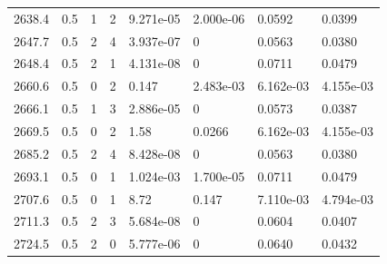 \documentclass[preview]{standalone}
\begin{document}
{{{{{{{\begin{tabular}{L{1.2cm}C{1.2cm} C{0.3cm}C{0.5cm} C{1.4cm}C{1.4cm} C{1.4cm}C{1.4cm}}
  2638.4  &   0.5  & 1     &  2 &  9.271e-05  & 2.000e-06  & 0.0592 &  0.0399   \\ 
  2647.7  &   0.5  & 2     &  4 &  3.937e-07  & 0  & 0.0563 &  0.0380   \\ 
  2648.4  &   0.5  & 2     &  1 &  4.131e-08  & 0  & 0.0711 &  0.0479   \\ 
  2660.6  &   0.5  & 0     &  2 &  0.147  & 2.483e-03  & 6.162e-03 &  4.155e-03   \\ 
  2666.1  &   0.5  & 1     &  3 &  2.886e-05  & 0  & 0.0573 &  0.0387   \\ 
  2669.5  &   0.5  & 0     &  2 &  1.58  & 0.0266  & 6.162e-03 &  4.155e-03   \\ 
  2685.2  &   0.5  & 2     &  4 &  8.428e-08  & 0  & 0.0563 &  0.0380   \\ 
  2693.1  &   0.5  & 0     &  1 &  1.024e-03  & 1.700e-05  & 0.0711 &  0.0479   \\ 
  2707.6  &   0.5  & 0     &  1 &  8.72  & 0.147  & 7.110e-03 &  4.794e-03   \\ 
  2711.3  &   0.5  & 2     &  3 &  5.684e-08  & 0  & 0.0604 &  0.0407   \\ 
  2724.5  &   0.5  & 2     &  0 &  5.777e-06  & 0  & 0.0640 &  0.0432   \\ 
\hline 
\end{tabular} 

}}}}}}}
\end{document}
